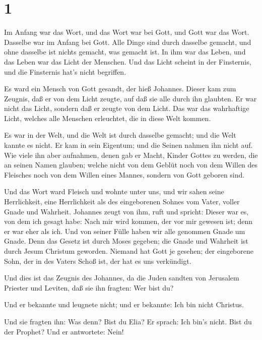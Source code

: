 \hypertarget{section}{%
\section{1}\label{section}}

 Im Anfang war das Wort, und das Wort war bei Gott, und Gott
war das Wort.  Dasselbe war im Anfang bei Gott. 
Alle Dinge sind durch dasselbe gemacht, und ohne dasselbe ist nichts
gemacht, was gemacht ist.  In ihm war das Leben, und das
Leben war das Licht der Menschen.  Und das Licht scheint in
der Finsternis, und die Finsternis hat's nicht begriffen.

 Es ward ein Mensch von Gott gesandt, der hieß Johannes.
 Dieser kam zum Zeugnis, daß er von dem Licht zeugte, auf
daß sie alle durch ihn glaubten.  Er war nicht das Licht,
sondern daß er zeugte von dem Licht.  Das war das
wahrhaftige Licht, welches alle Menschen erleuchtet, die in diese Welt
kommen.

 Es war in der Welt, und die Welt ist durch dasselbe
gemacht; und die Welt kannte es nicht.  Er kam in sein
Eigentum; und die Seinen nahmen ihn nicht auf.  Wie viele
ihn aber aufnahmen, denen gab er Macht, Kinder Gottes zu werden, die an
seinen Namen glauben;  welche nicht von dem Geblüt noch von
dem Willen des Fleisches noch von dem Willen eines Mannes, sondern von
Gott geboren sind.

 Und das Wort ward Fleisch und wohnte unter uns, und wir
sahen seine Herrlichkeit, eine Herrlichkeit als des eingeborenen Sohnes
vom Vater, voller Gnade und Wahrheit.  Johannes zeugt von
ihm, ruft und spricht: Dieser war es, von dem ich gesagt habe: Nach mir
wird kommen, der vor mir gewesen ist; denn er war eher als ich.
 Und von seiner Fülle haben wir alle genommen Gnade um
Gnade.  Denn das Gesetz ist durch Moses gegeben; die Gnade
und Wahrheit ist durch Jesum Christum geworden.  Niemand
hat Gott je gesehen; der eingeborene Sohn, der in des Vaters Schoß ist,
der hat es uns verkündigt.

 Und dies ist das Zeugnis des Johannes, da die Juden
sandten von Jerusalem Priester und Leviten, daß sie ihn fragten: Wer
bist du?

 Und er bekannte und leugnete nicht; und er bekannte: Ich
bin nicht Christus.

 Und sie fragten ihn: Was denn? Bist du Elia? Er sprach:
Ich bin's nicht. Bist du der Prophet? Und er antwortete: Nein!

